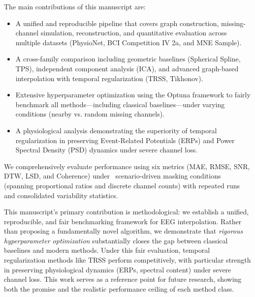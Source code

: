 The main contributions of this manuscript are:
\begin{itemize}
\item A unified and reproducible pipeline that covers graph construction, missing-channel simulation, reconstruction, and quantitative evaluation across multiple datasets (PhysioNet, BCI Competition IV 2a, and MNE Sample).
\item A cross-family comparison including geometric baselines (Spherical Spline, TPS), independent component analysis (ICA), and advanced graph-based interpolation with temporal regularization (TRSS, Tikhonov).
\item Extensive hyperparameter optimization using the Optuna framework to fairly benchmark all methods---including classical baselines---under varying conditions (nearby vs. random missing channels).
\item A physiological analysis demonstrating the superiority of temporal regularization in preserving Event-Related Potentials (ERPs) and Power Spectral Density (PSD) dynamics under severe channel loss.
\end{itemize}

We comprehensively evaluate performance using six metrics (MAE, RMSE, SNR, DTW, LSD, and Coherence) under \ResScenariosNamesEn~scenario-driven masking conditions (spanning proportional ratios and discrete channel counts) with repeated runs and consolidated variability statistics.

This manuscript's primary contribution is methodological: we establish a unified, reproducible, and fair benchmarking framework for EEG interpolation. Rather than proposing a fundamentally novel algorithm, we demonstrate that \emph{rigorous hyperparameter optimization} substantially closes the gap between classical baselines and modern methods. Under this fair evaluation, temporal regularization methods like TRSS perform competitively, with particular strength in preserving physiological dynamics (ERPs, spectral content) under severe channel loss. This work serves as a reference point for future research, showing both the promise and the realistic performance ceiling of each method class.
